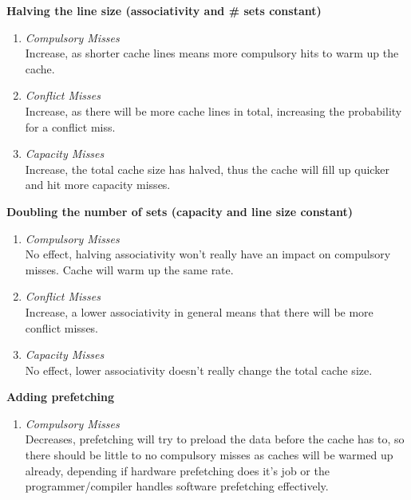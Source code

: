 \documentclass[11pt]{article}
\begin{document}
\begin{Parts}
	\Part \textbf{Halving the line size (associativity and \# sets constant)} \\
	\begin{enumerate}[i]
		\item \textit{Compulsory Misses} \\
		      Increase, as shorter cache lines means more compulsory hits to warm up the cache.
		\item \textit{Conflict Misses} \\
		      Increase, as there will be more cache lines in total, increasing the probability for a conflict miss.
		\item \textit{Capacity Misses} \\
		      Increase, the total cache size has halved, thus the cache will fill up quicker and hit more capacity misses.
	\end{enumerate}
	\Part \textbf{Doubling the number of sets (capacity and line size constant)} \\
	\begin{enumerate}[i]
		\item \textit{Compulsory Misses} \\
		      No effect, halving associativity won't really have an impact on compulsory misses. Cache will warm up the same rate.
		\item \textit{Conflict Misses} \\
		      Increase, a lower associativity in general means that there will be more conflict misses.
		\item \textit{Capacity Misses} \\
		      No effect, lower associativity doesn't really change the total cache size.
	\end{enumerate}
	\Part \textbf{Adding prefetching} \\
	\begin{enumerate}[i]
		\item \textit{Compulsory Misses} \\
		      Decreases, prefetching will try to preload the data before the cache has to, so there should be little to no compulsory misses as caches will be warmed up already, depending if hardware prefetching does it's job or the programmer/compiler handles software prefetching effectively.

\end{enumerate}
\end{Parts}
\end{document}

